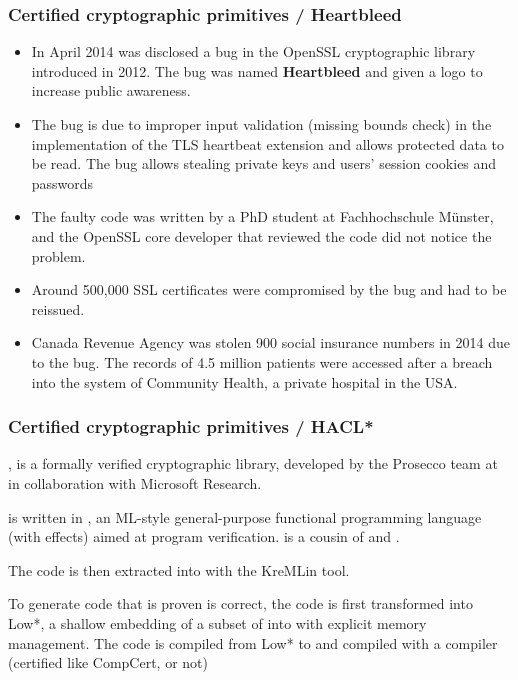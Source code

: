 \documentclass[compress,dvipdfmx]{beamer}
\begin{document}
\begin{frame}
  \frametitle{Certified cryptographic primitives / Heartbleed}

  \begin{itemize}

    \item In April 2014 was disclosed a bug in the OpenSSL
      cryptographic library introduced in 2012. The bug was named
      \textbf{Heartbleed} and given a logo to increase public
      awareness.

    \item The bug is due to improper input validation (missing bounds
      check) in the implementation of the TLS heartbeat extension and
      allows protected data to be read.  The bug allows stealing
      private keys and users' session cookies and passwords

    \item The faulty code was written by a PhD student at
      Fachhochschule Münster, and the OpenSSL core developer that
      reviewed the code did not notice the problem.

    \item Around 500,000 SSL certificates were compromised by the bug
      and had to be reissued.

    \item Canada Revenue Agency was stolen 900 social insurance
      numbers in 2014 due to the bug. The records of 4.5 million
      patients were accessed after a breach into the system of
      Community Health, a private hospital in the USA.

  \end{itemize}

\end{frame}


\begin{frame}
  \frametitle{Certified cryptographic primitives / HACL*}

  \HACLstar, is a formally verified cryptographic library, developed
  by the Prosecco team at \Inria in collaboration with Microsoft
  Research.

  \bigskip

  \HACLstar is written in \Fstar, an \textsf{ML}-style general-purpose
  functional programming language (with effects) aimed at program
  verification. \Fstar is a cousin of \OCaml and \Coq.

  \bigskip

  The \Fstar code is then extracted into \Clang with the
  \textsf{KreMLin} tool.

  \bigskip

  To generate \Clang code that is proven is correct, the \Fstar code
  is first transformed into \textsf{Low*}, a shallow embedding of a
  subset of \Clang into \Fstar with explicit memory management. The
  code is compiled from \textsf{Low*} to \Clang and compiled with a
  \Clang compiler (certified like CompCert, or not)

\end{frame}
\end{document}
